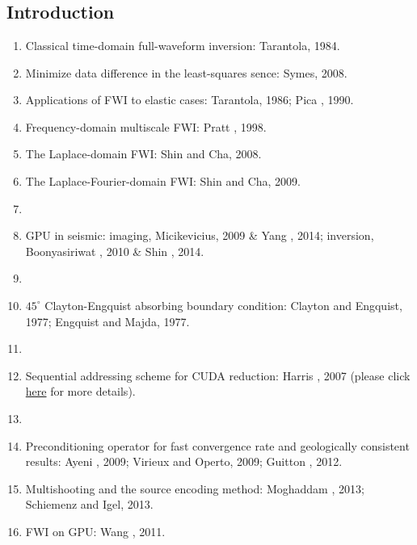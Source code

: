 \renewcommand{\pmk}{YangPL\_2015\_Geophy\_GPU implementation of FWI}
\renewcommand{\prf}{FWI/\pmk.pdf}
\renewcommand{\pti}{A graphics processing unit implementation of
  time-domain full-waveform inversion}
\renewcommand{\pay}{Pengliang Yang, Jinghuai Gao, and Baoli Wang, 2015}
\renewcommand{\pjo}{Geophysics}
\renewcommand{\pda}{2019/2/28 Thu.}

\section{\pinfo}

\subsection{Introduction}
\begin{enumerate}[\hspace{10mm}*]
  \item Classical time-domain full-waveform inversion: Tarantola, 1984.
  \item Minimize data difference in the least-squares sence: Symes, 2008.
  \item Applications of FWI to elastic cases: Tarantola, 1986; Pica \etal, 1990.
  \item Frequency-domain multiscale FWI: Pratt \etal, 1998.
  \item The Laplace-domain FWI: Shin and Cha, 2008.
  \item The Laplace-Fourier-domain FWI: Shin and Cha, 2009.
  \item \sline
  \item GPU in seismic: imaging, Micikevicius, 2009 \& Yang \etal, 2014;
    inversion, Boonyasiriwat \etal, 2010 \& Shin \etal, 2014.
  \item \sline
  \item $45^\circ$ Clayton-Engquist absorbing boundary condition:
    Clayton and Engquist, 1977; Engquist and Majda, 1977.
  \item \sline
  \item Sequential addressing scheme for CUDA reduction: Harris \etal, 2007
    (please click \href{http://vuduc.org/teaching/cse6230-hpcta-fa12/slides/cse6230-fa12--05b-reduction-notes.pdf}{here}
    for more details).
  \item \sline
  \item Preconditioning operator for fast convergence rate and
    geologically consistent results: Ayeni \etal, 2009;
    Virieux and Operto, 2009; Guitton \etal, 2012.
  \item Multishooting and the source encoding method:
    Moghaddam \etal, 2013; Schiemenz and Igel, 2013.
  \item FWI on GPU: Wang \etal, 2011.
\end{enumerate}

